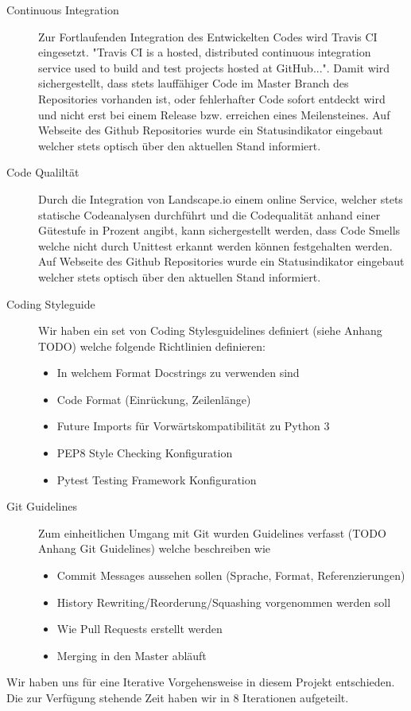 \begin{description}
\item[Continuous Integration]
Zur Fortlaufenden Integration des Entwickelten Codes wird Travis CI eingesetzt.
"Travis CI is a hosted, distributed continuous integration service used to build and test projects hosted at GitHub...". Damit wird sichergestellt, dass stets lauffähiger Code im Master Branch des Repositories vorhanden ist, oder fehlerhafter Code sofort entdeckt wird und nicht erst bei einem Release bzw. erreichen eines Meilensteines. Auf Webseite des Github Repositories wurde ein Statusindikator eingebaut welcher stets optisch über den aktuellen Stand informiert.

\item[Code Qualiltät]
Durch die Integration von Landscape.io einem online Service, welcher stets statische Codeanalysen durchführt und die Codequalität anhand einer Gütestufe in Prozent angibt, kann sichergestellt werden, dass Code Smells welche nicht durch Unittest erkannt werden können festgehalten werden. Auf Webseite des Github Repositories wurde ein Statusindikator eingebaut welcher stets optisch über den aktuellen Stand informiert.

\item[Coding Styleguide]
Wir haben ein set von Coding Stylesguidelines definiert (siehe Anhang TODO) welche folgende Richtlinien definieren:
\begin{itemize}
\item In welchem Format Docstrings zu verwenden sind
\item Code Format (Einrückung, Zeilenlänge)
\item Future Imports für Vorwärtskompatibilität zu Python 3
\item PEP8 Style Checking Konfiguration
\item Pytest Testing Framework Konfiguration
\end{itemize}

\item[Git Guidelines]
Zum einheitlichen Umgang mit Git wurden Guidelines verfasst (TODO Anhang Git Guidelines) welche beschreiben wie 
\begin{itemize}
\item Commit Messages aussehen sollen (Sprache, Format, Referenzierungen)
\item History Rewriting/Reorderung/Squashing vorgenommen werden soll
\item Wie Pull Requests erstellt werden
\item Merging in den Master abläuft
\end{itemize}

\end{description}
Wir haben uns für eine Iterative Vorgehensweise in diesem Projekt entschieden. Die zur Verfügung stehende Zeit haben wir in 8 Iterationen aufgeteilt.

